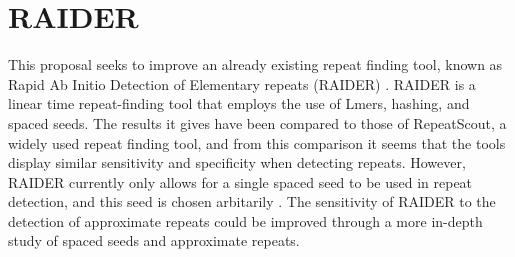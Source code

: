 \section{RAIDER}

This proposal seeks to improve an already existing repeat finding tool, known as Rapid Ab Initio Detection of Elementary repeats (RAIDER) \cite{figueroa2013raider}. RAIDER is a linear time repeat-finding tool that employs the use of Lmers, hashing, and spaced seeds. The results it gives have been compared to those of RepeatScout, a widely used repeat finding tool, and from this comparison it seems that the tools display similar sensitivity and specificity when detecting repeats. However, RAIDER currently only allows for a single spaced seed to be used in repeat detection, and this seed is chosen arbitarily \cite{figueroa2013raiderpaper}. The sensitivity of RAIDER to the detection of approximate repeats could be improved through a more in-depth study of spaced seeds and approximate repeats.